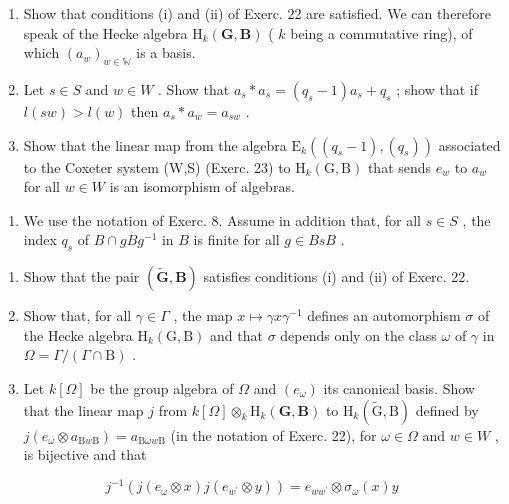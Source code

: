 \begin{enumerate}
\def\labelenumi{\alph{enumi})}
\item
  Show that conditions (i) and (ii) of Exerc. 22 are satisfied. We can therefore speak of the Hecke algebra \(\mathrm{H}_k(\mathbf{G},\mathbf{B})\) ( \(k\) being a commutative ring), of which \((a_w)_{w\in \mathbb{W}}\) is a basis.
\item
  Let \(s \in S\) and \(w \in W\) . Show that \(a_s * a_s = (q_s - 1)a_s + q_s\) ; show that if \(l(sw) > l(w)\) then \(a_s * a_w = a_{sw}\) .
\item
  Show that the linear map from the algebra \(\mathrm{E}_{k}((q_{s}-1),(q_{s}))\) associated to the Coxeter system (W,S) (Exerc. 23) to \(\mathrm{H}_{k}(\mathrm{G},\mathrm{B})\) that sends \(e_{w}\) to \(a_{w}\) for all \(w \in W\) is an isomorphism of algebras.
\end{enumerate}

\begin{enumerate}
\def\labelenumi{\arabic{enumi})}
\setcounter{enumi}{24}
\tightlist
\item
  We use the notation of Exerc. 8. Assume in addition that, for all \(s \in S\) , the index \(q_s\) of \(B \cap gBg^{-1}\) in \(B\) is finite for all \(g \in BsB\) .
\end{enumerate}

\begin{enumerate}
\def\labelenumi{\alph{enumi})}
\item
  Show that the pair \((\tilde{\mathbf{G}},\mathbf{B})\) satisfies conditions (i) and (ii) of Exerc. 22.
\item
  Show that, for all \(\gamma \in \Gamma\) , the map \(x \mapsto \gamma x \gamma^{-1}\) defines an automorphism \(\sigma\) of the Hecke algebra \(\mathrm{H}_k(\mathrm{G}, \mathrm{B})\) and that \(\sigma\) depends only on the class \(\omega\) of \(\gamma\) in \(\Omega = \Gamma / (\Gamma \cap \mathrm{B})\) .
\item
  Let \(k[\Omega]\) be the group algebra of \(\Omega\) and \((e_{\omega})\) its canonical basis. Show that the linear map \(j\) from \(k[\Omega] \otimes_k \mathrm{H}_k(\mathbf{G}, \mathbf{B})\) to \(\mathrm{H}_k(\tilde{\mathrm{G}}, \mathrm{B})\) defined by \(j(e_{\omega} \otimes a_{\mathrm{B}w\mathrm{B}}) = a_{\mathrm{B}\omega w\mathrm{B}}\) (in the notation of Exerc. 22), for \(\omega \in \Omega\) and \(w \in W\) , is bijective and that
\end{enumerate}

\[
j ^ {- 1} (j (e _ {\omega} \otimes x) j (e _ {w ^ {\prime}} \otimes y)) = e _ {w w ^ {\prime}} \otimes \sigma_ {\omega} (x) y
\]

